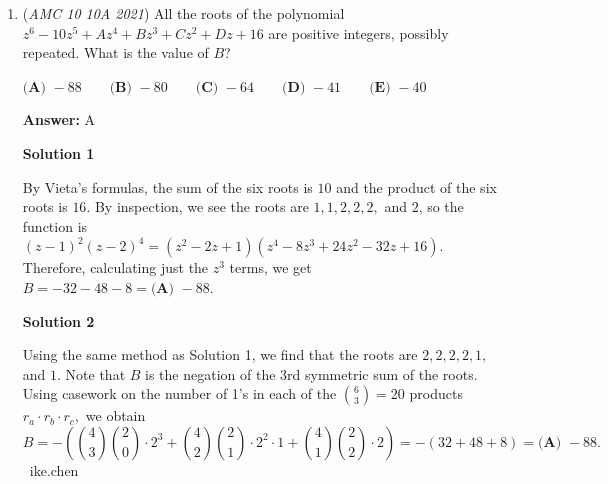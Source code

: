 \begin{enumerate}
 Given the observations from Solution 1, where $\triangle ACD, \triangle ABC,$ and $\triangle ABD$ are right triangles, the base is $\triangle ABD.$ We can apply the information about a trirectangular tetrahedron (all of the face angles are right angles), which states that the volume is
 \begin{align*} V&=\frac16\cdot AB\cdot AC\cdot BD \\ &=\frac16\cdot2\cdot4\cdot3 \\ &=\boxed{\textbf{(C)} ~4}. \end{align*}
~AMC60 (Solution)

 \textbf{Remark} Here is a similar problem from another AMC test: \href{https://artofproblemsolving.com/wiki/index.php?title=2015\_AMC\_10A\_Problems/Problem\_21}{2015 AMC 10A Problem 21}.

 


	\item (\textit{AMC 10 10A 2021}) All the roots of the polynomial $z^6-10z^5+Az^4+Bz^3+Cz^2+Dz+16$ are positive integers, possibly repeated. What is the value of $B$?


 $\textbf{(A) }{-}88 \qquad \textbf{(B) }{-}80 \qquad \textbf{(C) }{-}64 \qquad \textbf{(D) }{-}41\qquad \textbf{(E) }{-}40$

 \textbf{Answer: }A



\textbf{Solution 1}

By Vieta's formulas, the sum of the six roots is $10$ and the product of the six roots is $16$. By inspection, we see the roots are $1, 1, 2, 2, 2,$ and $2$, so the function is $(z-1)^2(z-2)^4=(z^2-2z+1)(z^4-8z^3+24z^2-32z+16)$. Therefore, calculating just the $z^3$ terms, we get $B = -32 - 48 - 8 = \boxed{\textbf{(A) }{-}88}$.

 



\textbf{Solution 2}

Using the same method as Solution 1, we find that the roots are $2, 2, 2, 2, 1,$ and $1$. Note that $B$ is the negation of the 3rd symmetric sum of the roots. Using casework on the number of 1's in each of the $\binom {6}{3} = 20$ products $r_a \cdot r_b \cdot r_c,$ we obtain 
 \[B= - \left(\binom {4}{3} \binom {2}{0} \cdot 2^{3} + \binom {4}{2} \binom{2}{1} \cdot 2^{2} \cdot 1 + \binom {4}{1} \binom {2}{2} \cdot 2 \right) = -\left(32+48+8 \right) = \boxed{\textbf{(A) }{-}88}.\]~ike.chen

 




\end{enumerate}
